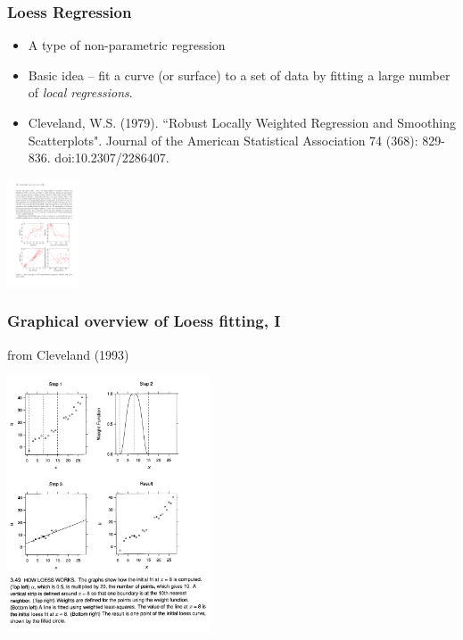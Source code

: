 \documentclass{beamer}
\begin{document}
\begin{frame}
  \frametitle{Loess Regression}
  
\begin{itemize}
    \item A type of non-parametric regression
    \item Basic idea -- fit a curve (or surface) to a set of data by fitting a large number of \emph{local regressions}.
    \item Cleveland, W.S. (1979). ``Robust Locally Weighted Regression and Smoothing Scatterplots". Journal of the American Statistical Association 74 (368): 829-836. doi:10.2307/2286407.
\end{itemize}

\begin{center}
\includegraphics[height=1.25in]{loess-example.pdf}
\end{center}  


\end{frame}

\begin{frame}
  \frametitle{Graphical overview of Loess fitting, I}  

{\tiny from Cleveland (1993)}
\begin{center}
\includegraphics[height=3in]{loess1.pdf}
\end{center}  

\end{frame}
\end{document}
